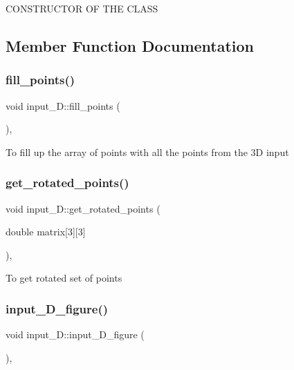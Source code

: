 C\+O\+N\+S\+T\+R\+U\+C\+T\+OR OF T\+HE C\+L\+A\+SS 

\subsection{Member Function Documentation}
\mbox{\label{classinput__3_d_a0da12f5747e6222813f14a2d7e12ae92}} 
\subsubsection{fill\+\_\+points()}
{\footnotesize\ttfamily void input\+\_\+D\+::fill\+\_\+points (\begin{DoxyParamCaption}{ }\end{DoxyParamCaption})\hspace{0.3cm}{\ttfamily [inline]}, {\ttfamily [private]}}

To fill up the array of points with all the points from the 3D input \mbox{\label{classinput__3_d_a1683389267f5f1f1bce73170cfcc31f6}} 
\subsubsection{get\+\_\+rotated\+\_\+points()}
{\footnotesize\ttfamily void input\+\_\+D\+::get\+\_\+rotated\+\_\+points (\begin{DoxyParamCaption}\item[{double}]{matrix[3][3] }\end{DoxyParamCaption})\hspace{0.3cm}{\ttfamily [inline]}, {\ttfamily [private]}}

To get rotated set of points \mbox{\label{classinput__3_d_a224542403e7c379a410c05b26bd589c4}} 
\subsubsection{input\+\_\+D\+\_\+figure()}
{\footnotesize\ttfamily void input\+\_\+D\+::input\+\_\+D\+\_\+figure (\begin{DoxyParamCaption}{ }\end{DoxyParamCaption})\hspace{0.3cm}{\ttfamily [inline]}, {\ttfamily [private]}}

